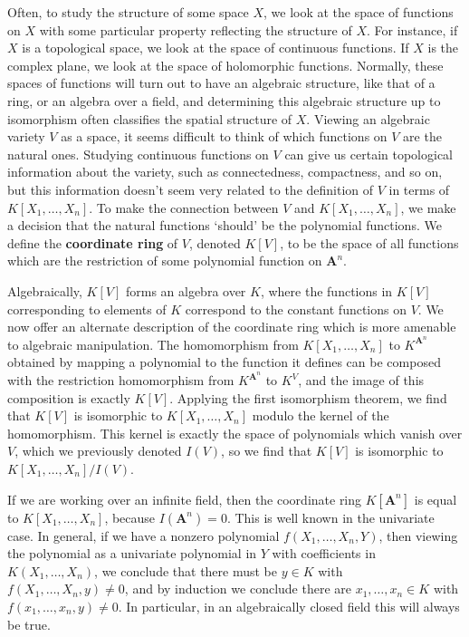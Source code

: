 Often, to study the structure of some space $X$, we look at the space of functions on $X$ with some particular property reflecting the structure of $X$. For instance, if $X$ is a topological space, we look at the space of continuous functions. If $X$ is the complex plane, we look at the space of holomorphic functions. Normally, these spaces of functions will turn out to have an algebraic structure, like that of a ring, or an algebra over a field, and determining this algebraic structure up to isomorphism often classifies the spatial structure of $X$. Viewing an algebraic variety $V$ as a space, it seems difficult to think of which functions on $V$ are the natural ones. Studying continuous functions on $V$ can give us certain topological information about the variety, such as connectedness, compactness, and so on, but this information doesn't seem very related to the definition of $V$ in terms of $K[X_1, \dots, X_n]$. To make the connection between $V$ and $K[X_1, \dots, X_n]$, we make a decision that the natural functions `should' be the polynomial functions. We define the {\bf coordinate ring} of $V$, denoted $K[V]$, to be the space of all functions which are the restriction of some polynomial function on $\mathbf{A}^n$.

Algebraically, $K[V]$ forms an algebra over $K$, where the functions in $K[V]$ corresponding to elements of $K$ correspond to the constant functions on $V$. We now offer an alternate description of the coordinate ring which is more amenable to algebraic manipulation. The homomorphism from $K[X_1, \dots, X_n]$ to $K^{\mathbf{A}^n}$ obtained by mapping a polynomial to the function it defines can be composed with the restriction homomorphism from $K^{\mathbf{A}^n}$ to $K^V$, and the image of this composition is exactly $K[V]$. Applying the first isomorphism theorem, we find that $K[V]$ is isomorphic to $K[X_1, \dots, X_n]$ modulo the kernel of the homomorphism. This kernel is exactly the space of polynomials which vanish over $V$, which we previously denoted $I(V)$, so we find that $K[V]$ is isomorphic to $K[X_1, \dots, X_n]/I(V)$.

\begin{example}
    If we are working over an infinite field, then the coordinate ring $K[\mathbf{A}^n]$ is equal to $K[X_1, \dots, X_n]$, because $I(\mathbf{A}^n) = 0$. This is well known in the univariate case. In general, if we have a nonzero polynomial $f(X_1, \dots, X_n,Y)$, then viewing the polynomial as a univariate polynomial in $Y$ with coefficients in $K(X_1, \dots, X_n)$, we conclude that there must be $y \in K$ with $f(X_1, \dots, X_n,y) \neq 0$, and by induction we conclude there are $x_1, \dots, x_n \in K$ with $f(x_1, \dots, x_n, y) \neq 0$. In particular, in an algebraically closed field this will always be true.
\end{example}

